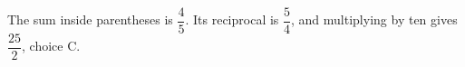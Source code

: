 The sum inside parentheses is $\dfrac{4}{5}$. Its reciprocal is $\dfrac{5}{4}$, and multiplying by ten gives $\boxed{\dfrac{25}{2}}$, choice C.
